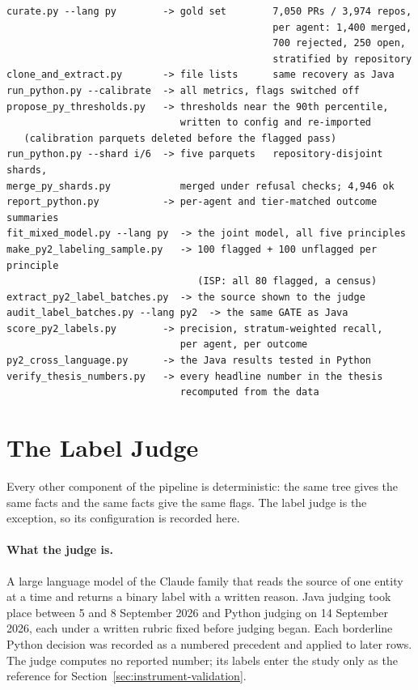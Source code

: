\footnotesize
\begin{verbatim}
curate.py --lang py        -> gold set        7,050 PRs / 3,974 repos,
                                              per agent: 1,400 merged,
                                              700 rejected, 250 open,
                                              stratified by repository
clone_and_extract.py       -> file lists      same recovery as Java
run_python.py --calibrate  -> all metrics, flags switched off
propose_py_thresholds.py   -> thresholds near the 90th percentile,
                              written to config and re-imported
   (calibration parquets deleted before the flagged pass)
run_python.py --shard i/6  -> five parquets   repository-disjoint shards,
merge_py_shards.py            merged under refusal checks; 4,946 ok
report_python.py           -> per-agent and tier-matched outcome summaries
fit_mixed_model.py --lang py  -> the joint model, all five principles
make_py2_labeling_sample.py   -> 100 flagged + 100 unflagged per principle
                                 (ISP: all 80 flagged, a census)
extract_py2_label_batches.py  -> the source shown to the judge
audit_label_batches.py --lang py2  -> the same GATE as Java
score_py2_labels.py        -> precision, stratum-weighted recall,
                              per agent, per outcome
py2_cross_language.py      -> the Java results tested in Python
verify_thesis_numbers.py   -> every headline number in the thesis
                              recomputed from the data
\end{verbatim}
\normalsize

\section*{The Label Judge}
\label{app:judge}

Every other component of the pipeline is deterministic: the same tree gives the same facts and the
same facts give the same flags. The label judge is the exception, so its configuration is recorded
here.

\paragraph{What the judge is.} A large language model of the Claude family that reads the source of
one entity at a time and returns a binary label with a written reason. Java judging took place
between 5 and 8 September 2026 and Python judging on 14 September 2026, each under a written rubric
fixed before judging began. Each borderline Python decision was recorded as a numbered precedent and
applied to later rows. The judge computes no reported number; its labels enter the study only as the
reference for Section~\ref{sec:instrument-validation}.

